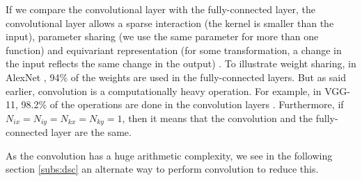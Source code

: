 If we compare the convolutional layer with the fully-connected layer, the convolutional layer allows a sparse interaction (the kernel is smaller than the input), parameter sharing (we use the same parameter for more than one function) and equivariant representation (for some transformation, a change in the input reflects the same change in the output) \cite{goodfellow_deep_2016}. To illustrate weight sharing, in AlexNet \cite{krizhevsky_imagenet_2012}, 94\% of the weights are used in the fully-connected layers. But as said earlier, convolution is a computationally heavy operation. For example, in VGG-11, 98.2\% of the operations are done in the convolution layers \cite{guo_survey_2018}. Furthermore, if $N_{ix} = N_{iy} = N_{kx} = N_{ky} = 1$, then it means that the convolution and the fully-connected layer are the same.

As the convolution has a huge arithmetic complexity, we see in the following section \ref{subs:dsc} an alternate way to perform convolution to reduce this.
